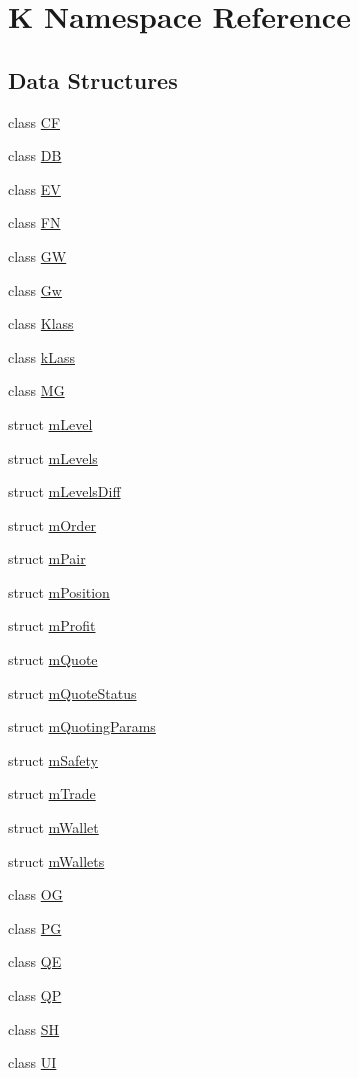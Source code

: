 \hypertarget{namespace_k}{}\section{K Namespace Reference}
\label{namespace_k}
\subsection*{Data Structures}
\begin{DoxyCompactItemize}
\item 
class \hyperlink{class_k_1_1_c_f}{CF}
\item 
class \hyperlink{class_k_1_1_d_b}{DB}
\item 
class \hyperlink{class_k_1_1_e_v}{EV}
\item 
class \hyperlink{class_k_1_1_f_n}{FN}
\item 
class \hyperlink{class_k_1_1_g_w}{GW}
\item 
class \hyperlink{class_k_1_1_gw}{Gw}
\item 
class \hyperlink{class_k_1_1_klass}{Klass}
\item 
class \hyperlink{class_k_1_1k_lass}{k\+Lass}
\item 
class \hyperlink{class_k_1_1_m_g}{MG}
\item 
struct \hyperlink{struct_k_1_1m_level}{m\+Level}
\item 
struct \hyperlink{struct_k_1_1m_levels}{m\+Levels}
\item 
struct \hyperlink{struct_k_1_1m_levels_diff}{m\+Levels\+Diff}
\item 
struct \hyperlink{struct_k_1_1m_order}{m\+Order}
\item 
struct \hyperlink{struct_k_1_1m_pair}{m\+Pair}
\item 
struct \hyperlink{struct_k_1_1m_position}{m\+Position}
\item 
struct \hyperlink{struct_k_1_1m_profit}{m\+Profit}
\item 
struct \hyperlink{struct_k_1_1m_quote}{m\+Quote}
\item 
struct \hyperlink{struct_k_1_1m_quote_status}{m\+Quote\+Status}
\item 
struct \hyperlink{struct_k_1_1m_quoting_params}{m\+Quoting\+Params}
\item 
struct \hyperlink{struct_k_1_1m_safety}{m\+Safety}
\item 
struct \hyperlink{struct_k_1_1m_trade}{m\+Trade}
\item 
struct \hyperlink{struct_k_1_1m_wallet}{m\+Wallet}
\item 
struct \hyperlink{struct_k_1_1m_wallets}{m\+Wallets}
\item 
class \hyperlink{class_k_1_1_o_g}{OG}
\item 
class \hyperlink{class_k_1_1_p_g}{PG}
\item 
class \hyperlink{class_k_1_1_q_e}{QE}
\item 
class \hyperlink{class_k_1_1_q_p}{QP}
\item 
class \hyperlink{class_k_1_1_s_h}{SH}
\item 
class \hyperlink{class_k_1_1_u_i}{UI}
\end{DoxyCompactItemize}
